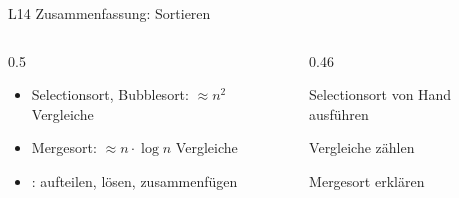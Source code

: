 \documentclass[aspectratio=169,12pt,xcolor={dvipsnames}]{beamer}
\begin{document}
\begin{frame}{L14 Zusammenfassung: Sortieren}
  \begin{columns}[T]
    \begin{column}{0.5\textwidth}
      \begin{itemize}
        \item Selectionsort, Bubblesort: $\approx n^2$ Vergleiche
        \item Mergesort: $\approx n \cdot \log n$ Vergleiche
        \item {}: aufteilen, lösen, zusammenfügen
      \end{itemize}
    \end{column}
    \begin{column}{0.46\textwidth}
      \begin{checklist}
        \item Selectionsort von Hand ausführen
        \item Vergleiche zählen
        \item Mergesort erklären
      \end{checklist}
    \end{column}
  \end{columns}
\end{frame}

\end{document}
